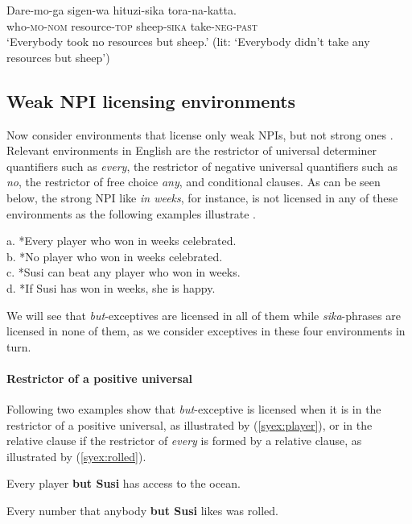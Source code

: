 \documentclass[output=paper,colorlinks,citecolor=brown,
]{langscibook}
\def\M#1{\textsc{#1}}
\begin{document}
\ea \label{syex:daremoga}
\gll Dare-mo-ga sigen-wa hituzi-sika tora-na-katta.\\
who-\M{mo}-\M{nom} resource-\M{top} sheep-\M{sika} take-\M{neg-past}\\
\glt `Everybody took no resources but sheep.' (lit: `Everybody didn't take any resources but sheep')\z



\subsection{Weak NPI licensing environments}

Now consider environments that license only weak NPIs, but not strong ones \citep{zwarts98a,gajewski11a}.
Relevant environments in English are the restrictor of universal determiner quantifiers such as \emph{every}, the restrictor of negative universal quantifiers such as \emph{no}, the restrictor of free choice \emph{any}, and conditional clauses.  
As can be seen below, the strong NPI like \emph{in weeks}, for instance, is not licensed in any of these environments as the following examples illustrate \citep{hoeksema05m}.

\ea a. *Every player who won in weeks celebrated.\\
    b. *No player who won in weeks celebrated.\\
    c. *Susi can beat any player who won in weeks.\\
    d. *If Susi has won in weeks, she is happy.\z

We will see that \emph{but}-exceptives are licensed in all of them while \emph{sika}-phrases are licensed in none of them, as we consider exceptives in these four environments in turn.

\paragraph{Restrictor of a positive universal} 
Following two examples show that \emph{but}-exceptive is licensed when it is in the restrictor of a positive universal, as illustrated by (\ref{syex:player}), or in the relative clause if the restrictor of \emph{every} is formed by a relative clause, as illustrated by (\ref{syex:rolled}).

\ea \label{syex:player} 
   Every player \textbf{but Susi} has access to the ocean.\z

\ea \label{syex:rolled}
    Every number that anybody \textbf{but Susi} likes was rolled.\z
\end{document}
